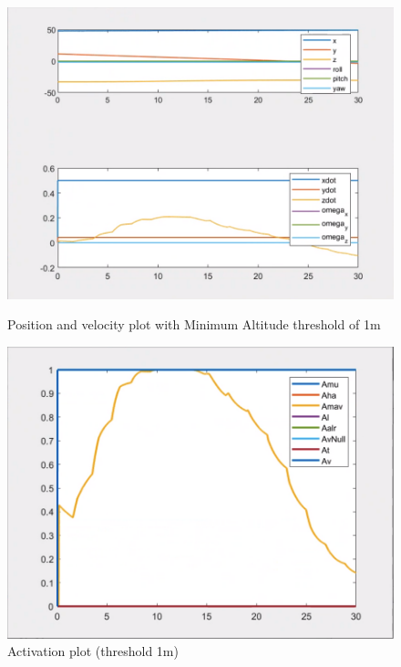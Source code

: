 \documentclass{article}
\begin{document}
\begin{figure}[htpb] 
\begin{minipage}{0.40\textwidth}  
\includegraphics[width=\textwidth]{123_1m_ppdot.png}
\caption{Position and velocity plot with Minimum Altitude threshold of 1m}\label{1m_ppdot} 
\end{minipage}  
\hspace{0.2\textwidth} 
\begin{minipage}{0.43\textwidth}  
\includegraphics[width=\textwidth]{123_1m_A.png}
\caption{Activation plot (threshold 1m) }\label{1m_A} 
\end{minipage} 
\end{figure}
\end{document}
